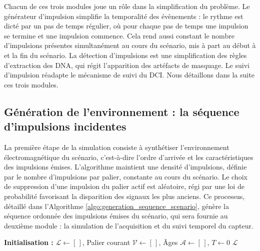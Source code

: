 Chacun de ces trois modules joue un rôle dans la simplification du problème. Le générateur d'impulsion simplifie la temporalité des évènements : le rythme est dicté par un pas de temps régulier, où pour chaque pas de temps une impulsion se termine et une impulsion commence. Cela rend aussi constant le nombre d'impulsions présentes simultanément au cours du scénario, mis à part au début à et la fin du scénario. La détection d'impulsions est une simplification des règles d'extraction des DNA, qui régit l'apparition des artéfacts de masquage. Le suivi d'impulsion réadapte le mécanisme de suivi du DCI. Nous détaillons dans la suite ces trois modules.  

\subsection{Génération de l'environnement : la séquence d'impulsions incidentes}
La première étape de la simulation consiste à synthétiser l'environnement électromagnétique du scénario, c'est-à-dire l'ordre d'arrivée et les caractéristiques des impulsions émises. L'algorithme maintient une densité d'impulsions, définie par le nombre d'impulsions par palier, constante au cours du scénario. Le choix de suppression d'une impulsion du palier actif est aléatoire, régi par une loi de probabilité favorisant la disparition des signaux les plus anciens. Ce processus, détaillé dans l'Algorithme \ref{algo:generation_sequence_scenario}, génère la séquence ordonnée des impulsions émises du scénario, qui sera fournie au deuxième module : la simulation de l'acquisition et du suivi temporel du capteur.  

\begin{algorithm}[htbp]
\DontPrintSemicolon
\SetAlgoLined
{}
\textbf{Initialisation :} $\mathcal{L} \leftarrow [\,]$, Palier courant $\mathcal{V} \leftarrow [\,]$, Âges $\mathcal{A} \leftarrow [\,]$, $T \leftarrow 0$\;
\vspace{2mm}
\Return $\mathcal{L}$

\caption{Génération stochastique de la séquence d'impulsions incidentes}
\label{algo:generation_sequence_scenario}
\end{algorithm}

